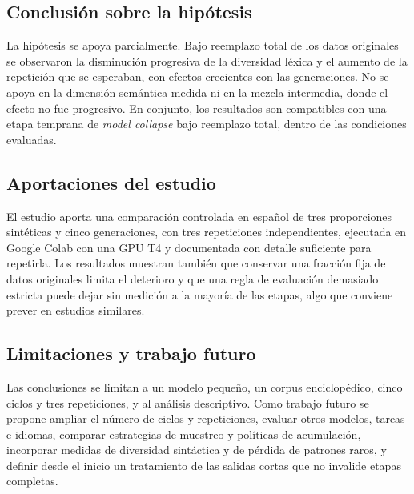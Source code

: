 \documentclass[12pt,letterpaper]{article}
\begin{document}
\subsection{Conclusión sobre la hipótesis}

La hipótesis se apoya parcialmente. Bajo reemplazo total de los datos
originales se observaron la disminución progresiva de la diversidad
léxica y el aumento de la repetición que se esperaban, con efectos
crecientes con las generaciones. No se apoya en la dimensión semántica
medida ni en la mezcla intermedia, donde el efecto no fue progresivo.
En conjunto, los resultados son compatibles con una etapa temprana de
\textit{model collapse} bajo reemplazo total, dentro de las condiciones
evaluadas.

\subsection{Aportaciones del estudio}

El estudio aporta una comparación controlada en español de tres
proporciones sintéticas y cinco generaciones, con tres repeticiones
independientes, ejecutada en Google Colab con una GPU T4 y documentada
con detalle suficiente para repetirla. Los resultados muestran
también que conservar una fracción fija de datos originales limita el
deterioro y que una regla de evaluación demasiado estricta puede dejar
sin medición a la mayoría de las etapas, algo que conviene prever en
estudios similares.

\subsection{Limitaciones y trabajo futuro}

Las conclusiones se limitan a un modelo pequeño, un corpus enciclopédico,
cinco ciclos y tres repeticiones, y al análisis descriptivo. Como trabajo
futuro se propone ampliar el número de ciclos y repeticiones, evaluar
otros modelos, tareas e idiomas, comparar estrategias de muestreo y
políticas de acumulación, incorporar medidas de diversidad sintáctica y
de pérdida de patrones raros, y definir desde el inicio un tratamiento de
las salidas cortas que no invalide etapas completas.
\end{document}
